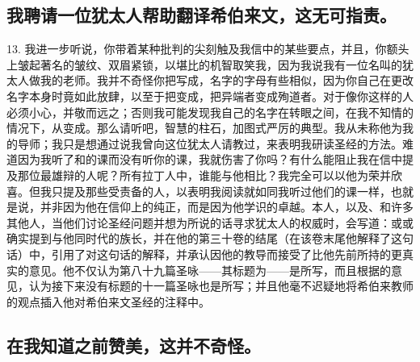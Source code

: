 
\subsection{我聘请一位犹太人帮助翻译希伯来文，这无可指责。}

13. 我进一步听说，你带着某种批判的尖刻触及我信中的某些要点，并且，你额头上皱起著名的皱纹、双眉紧锁，以堪比的机智取笑我，因为我说我有一位名叫的犹太人做我的老师。我并不奇怪你把写成，名字的字母有些相似，因为你自己在更改名字本身时竟如此放肆，以至于把变成，把异端者变成殉道者。对于像你这样的人必须小心，并敬而远之；否则我可能发现我自己的名字在转眼之间，在我不知情的情况下，从变成。那么请听吧，智慧的柱石，加图式严厉的典型。我从未称他为我的导师；我只是想通过说我曾向这位犹太人请教过，来表明我研读圣经的方法。难道因为我听了和的课而没有听你的课，我就伤害了你吗？有什么能阻止我在信中提及那位最雄辩的人呢？所有拉丁人中，谁能与他相比？我完全可以以他为荣并欣喜。但我只提及那些受责备的人，以表明我阅读就如同我听过他们的课一样，也就是说，并非因为他在信仰上的纯正，而是因为他学识的卓越。本人，以及、和许多其他人，当他们讨论圣经问题并想为所说的话寻求犹太人的权威时，会写道：或或确实提到与他同时代的族长，并在他的第三十卷的结尾（在该卷末尾他解释了这句话）中，引用了对这句话的解释，并承认因他的教导而接受了比他先前所持的更真实的意见。他不仅认为第八十九篇圣咏——其标题为——是所写，而且根据的意见，认为接下来没有标题的十一篇圣咏也是所写；并且他毫不迟疑地将希伯来教师的观点插入他对希伯来文圣经的注释中。\par


\subsection{在我知道之前赞美，这并不奇怪。}

